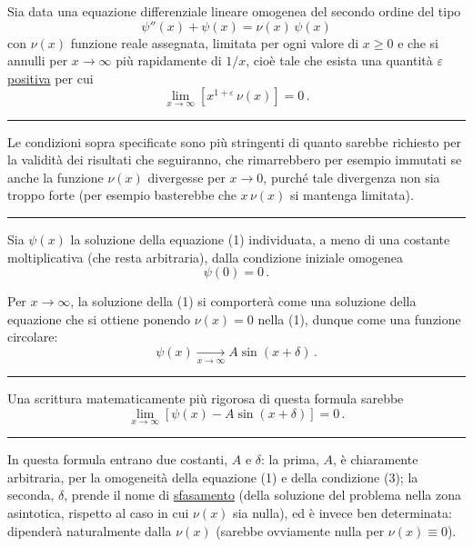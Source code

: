 \documentclass[11pt, a4paper]{book}
\numberwithin{equation}{section}
\begin{document}
Sia data una equazione differenziale lineare omogenea del secondo ordine del tipo
\begin{equation}
\psi''(x) + \psi(x) = \nu(x)\,\psi(x) \tag{1}
\end{equation}
con $\nu(x)$ funzione reale assegnata, limitata per ogni valore di $x \geq 0$ e che si annulli per $x \to \infty$ più rapidamente di $1/x$, cioè tale che esista una quantità $\varepsilon$ \underline{positiva} per cui
\begin{equation}
\lim_{x \to \infty} \left[x^{1+\varepsilon}\,\nu(x)\right] = 0\,. \tag{2}
\end{equation}

\noindent\rule{\linewidth}{0.4pt}

Le condizioni sopra specificate sono più stringenti di quanto sarebbe richiesto per la validità dei risultati che seguiranno, che rimarrebbero per esempio immutati se anche la funzione $\nu(x)$ divergesse per $x \to 0$, purché tale divergenza non sia troppo forte (per esempio basterebbe che $x\,\nu(x)$ si mantenga limitata).

\noindent\rule{\linewidth}{0.4pt}

Sia $\psi(x)$ la soluzione della equazione (1) individuata, a meno di una costante moltiplicativa (che resta arbitraria), dalla condizione iniziale omogenea
\begin{equation}
\psi(0) = 0\,. \tag{3}
\end{equation}

Per $x \to \infty$, la soluzione della (1) si comporterà come una soluzione della equazione che si ottiene ponendo $\nu(x) = 0$ nella (1), dunque come una funzione circolare:
\begin{equation}
\psi(x) \xrightarrow[x \to \infty]{} A\sin(x + \delta)\,. \tag{4}
\end{equation}

\noindent\rule{\linewidth}{0.4pt}

Una scrittura matematicamente più rigorosa di questa formula sarebbe
\[
\lim_{x \to \infty}\left[\psi(x) - A\sin(x+\delta)\right] = 0\,.
\]

\noindent\rule{\linewidth}{0.4pt}


In questa formula entrano due costanti, $A$ e $\delta$: la prima, $A$, è chiaramente arbitraria, per la omogeneità della equazione (1) e della condizione (3); la seconda, $\delta$, prende il nome di \underline{sfasamento} (della soluzione del problema nella zona asintotica, rispetto al caso in cui $\nu(x)$ sia nulla), ed è invece ben determinata: dipenderà naturalmente dalla $\nu(x)$ (sarebbe ovviamente nulla per $\nu(x) \equiv 0$).
\end{document}

